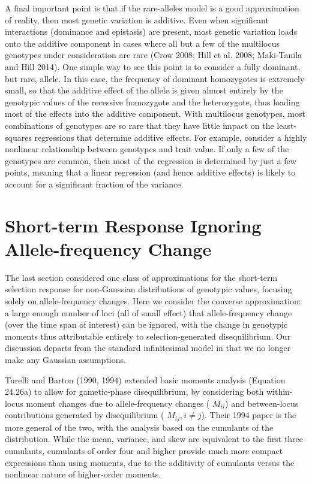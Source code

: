 \documentclass{article}
\begin{document}
A final important point is that if the rare-alleles model is a good approximation of reality, then most genetic variation is additive. Even when significant interactions (dominance and epistasis) are present, most genetic variation loads onto the additive component in cases where all but a few of the multilocus genotypes under consideration are rare (Crow 2008; Hill et al. 2008; Maki-Tanila and Hill 2014). One simple way to see this point is to consider a fully dominant, but rare, allele. In this case, the frequency of dominant homozygotes is extremely small, so that the additive effect of the allele is given almost entirely by the genotypic values of the recessive homozygote and the heterozygote, thus loading most of the effects into the additive component. With multilocus genotypes, most combinations of genotypes are so rare that they have little impact on the least-squares regressions that determine additive effects. For example, consider a highly nonlinear relationship between genotypes and trait value. If only a few of the genotypes are common, then most of the regression is determined by just a few points, meaning that a linear regression (and hence additive effects) is likely to account for a significant fraction of the variance.

\section{Short-term Response Ignoring Allele-frequency Change}
The last section considered one class of approximations for the short-term selection response for non-Gaussian distributions of genotypic values, focusing solely on allele-frequency changes. Here we consider the converse approximation: a large enough number of loci (all of small effect) that allele-frequency change (over the time span of interest) can be ignored, with the change in genotypic moments thus attributable entirely to selection-generated disequilibrium. Our discussion departs from the standard infinitesimal model in that we no longer make any Gaussian assumptions.

Turelli and Barton (1990, 1994) extended basic moments analysis (Equation 24.26a) to allow for gametic-phase disequilibrium, by considering both within-locus moment changes due to allele-frequency changes ( $ M_{ii} $) and between-locus contributions generated by disequilibrium ( $ M_{ij}, i \neq j $). Their 1994 paper is the more general of the two, with the analysis based on the cumulants of the distribution. While the mean, variance, and skew are equivalent to the first three cumulants, cumulants of order four and higher provide much more compact expressions than using moments, due to the additivity of cumulants versus the nonlinear nature of higher-order moments.
\end{document}
